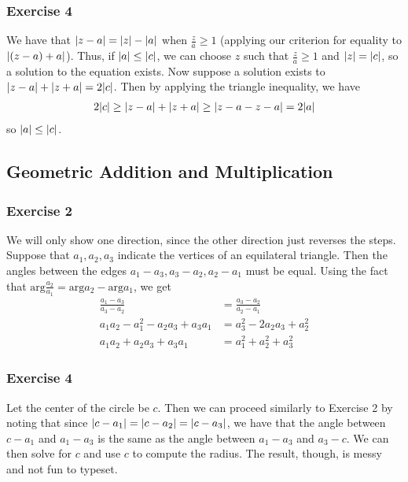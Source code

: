 \subsubsection{Exercise 4}
We have that $\abs{z - a} = \abs{z} - \abs{a}$ when $\frac{z}{a} \geq 1$ (applying our criterion for equality
to $\abs{(z - a) + a}$). Thus, if $\abs{a} \leq \abs{c}$, we can choose $z$ such that $\frac{z}{a} \geq 1$ 
and $\abs{z} = \abs{c}$, so a solution to the equation exists. Now suppose a solution exists to 
 $\abs{z - a} + \abs{z + a} = 2\abs{c}$. Then by applying the triangle inequality, we have 
 \begin{align*}
         2\abs{c} \geq \abs{z - a} + \abs{z + a} \geq \abs{z - a - z - a} = 2\abs{a}
 \end{align*}
 so $\abs{a} \leq \abs{c}$.

\subsection{Geometric Addition and Multiplication}

\subsubsection{Exercise 2}
We will only show one direction, since the other direction just reverses the steps. Suppose that 
$a_1, a_2, a_3$ indicate the vertices of an equilateral triangle. Then the angles between the edges
$a_1 - a_3, a_3 - a_2, a_2 - a_1$ must be equal. Using the fact that $\text{arg} \frac{a_2}{a_1} = \text{arg} a_2 - \text{arg} a_1$, we get
\begin{align*}
        \frac{a_1 - a_3}{a_3 - a_2} &= \frac{a_3 - a_2}{a_2 - a_1} \\
        a_1 a_2 - a_1^2 - a_2 a_3 + a_3 a_1 &= a_3^2 - 2 a_2 a_3 + a_2^2 \\
        a_1 a_2 + a_2 a_3 + a_3 a_1 &= a_1^2 + a_2^2 + a_3^2
\end{align*}

\subsubsection{Exercise 4}
Let the center of the circle be $c$. Then we can proceed similarly to Exercise 2 by noting that since
$\abs{c - a_1} = \abs{c - a_2} = \abs{c - a_3}$, we have that the angle between $c - a_1$ and $a_1 - a_3$ 
is the same as the angle between $a_1 - a_3$ and $a_3 - c$. We can then solve for $c$ and use $c$ to compute
the radius. The result, though, is messy and not fun to typeset.
